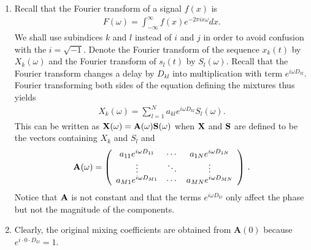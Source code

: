 \begin{enumerate}
\begin{solution}
    \begin{enumerate}
    \item Recall that the Fourier transform of a signal $f(x)$ is
      \begin{align*}
        F(\omega) = \int^{\infty}_{-\infty} f(x) e^{-2\pi i x \omega}
        dx.
      \end{align*}
      We shall use subindices $k$ and $l$ instead of $i$ and $j$ in
      order to avoid confusion with the $i = \sqrt{-1}$.  Denote the
      Fourier transform of the sequence $x_k(t)$ by $X_k(\omega)$ and
      the Fourier transform of $s_l(t)$ by $S_l(\omega)$.  Recall that
      the Fourier transform changes a delay by $D_{kl}$ into
      multiplication with term $e^{i\omega D_{kl}}$.  Fourier
      transforming both sides of the equation defining the mixtures
      thus yields
      \begin{align*}
        X_k(\omega) = \sum_{l=1}^N a_{kl} e^{i\omega
          D_{kl}} S_l(\omega) .
      \end{align*}
      This can be written as $\bf{X}(\omega) = \bf{A}(\omega)
      \bf{S}(\omega)$ when $\bf{X}$ and $\bf{S}$ are defined to be the
      vectors containing $X_k$ and $S_l$ and
      \[
      \bf{A}(\omega) = \left( \begin{array}{ccc} a_{11}e^{i\omega
            D_{11}} & \cdots & a_{1N}e^{i\omega D_{1N}} \\ \vdots & \ddots &
          \vdots \\ a_{M1}e^{i\omega D_{M1}} & \cdots & a_{MN}e^{i\omega
            D_{MN}} \end{array} \right) \, .
      \]
      Notice that ${\bf A}$ is not constant and that the terms
      $e^{i\omega D_{kl}}$ only affect the phase but not the magnitude
      of the components.

    \item Clearly, the original mixing coefficients are obtained from
      $\mathbf{A}(0)$ because $e^{i \cdot 0 \cdot  D_{kl}}=1$.
    \end{enumerate}
  \end{solution}


\end{enumerate}
